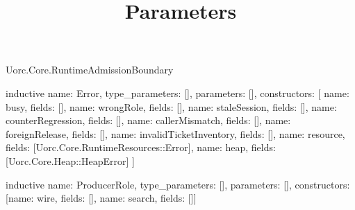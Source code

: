 \begin{lexlean}{Uorc.Core.RuntimeAdmissionBoundary}
\title{Parameters}
\begin{semanticmodule}
inductive{
  name: Error,
  type_parameters: [],
  parameters: [],
  constructors: [
    {name: busy, fields: []},
    {name: wrongRole, fields: []},
    {name: staleSession, fields: []},
    {name: counterRegression, fields: []},
    {name: callerMismatch, fields: []},
    {name: foreignRelease, fields: []},
    {name: invalidTicketInventory, fields: []},
    {name: resource, fields: [Uorc.Core.RuntimeResources::Error]},
    {name: heap, fields: [Uorc.Core.Heap::HeapError]}
  ]
}

inductive{
  name: ProducerRole,
  type_parameters: [],
  parameters: [],
  constructors: [{name: wire, fields: []}, {name: search, fields: []}]
}


\end{semanticmodule}
\end{lexlean}
